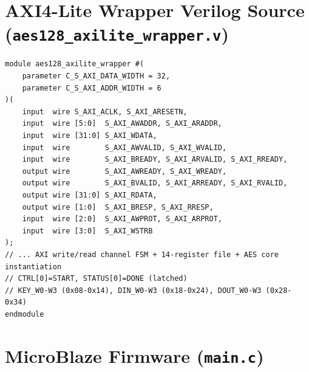 \documentclass[12pt,a4paper]{article}
\begin{document}
\renewcommand{\thesection}{B}
\section{AXI4-Lite Wrapper Verilog Source (\texttt{aes128\_axilite\_wrapper.v})}
\label{app:axi_wrapper}

\begin{lstlisting}[style=verilogstyle, caption={aes128\_axilite\_wrapper.v -- AXI4-Lite Slave Wrapper with 14 Registers}]
module aes128_axilite_wrapper #(
    parameter C_S_AXI_DATA_WIDTH = 32,
    parameter C_S_AXI_ADDR_WIDTH = 6
)(
    input  wire S_AXI_ACLK, S_AXI_ARESETN,
    input  wire [5:0]  S_AXI_AWADDR, S_AXI_ARADDR,
    input  wire [31:0] S_AXI_WDATA,
    input  wire        S_AXI_AWVALID, S_AXI_WVALID,
    input  wire        S_AXI_BREADY, S_AXI_ARVALID, S_AXI_RREADY,
    output wire        S_AXI_AWREADY, S_AXI_WREADY,
    output wire        S_AXI_BVALID, S_AXI_ARREADY, S_AXI_RVALID,
    output wire [31:0] S_AXI_RDATA,
    output wire [1:0]  S_AXI_BRESP, S_AXI_RRESP,
    input  wire [2:0]  S_AXI_AWPROT, S_AXI_ARPROT,
    input  wire [3:0]  S_AXI_WSTRB
);
// ... AXI write/read channel FSM + 14-register file + AES core instantiation
// CTRL[0]=START, STATUS[0]=DONE (latched)
// KEY_W0-W3 (0x08-0x14), DIN_W0-W3 (0x18-0x24), DOUT_W0-W3 (0x28-0x34)
endmodule
\end{lstlisting}

\renewcommand{\thesection}{C}
\section{MicroBlaze Firmware (\texttt{main.c})}
\label{app:main_c}
\end{document}
